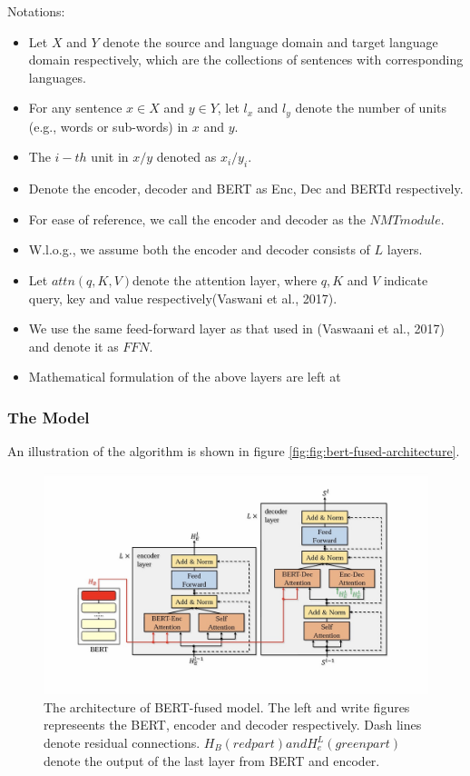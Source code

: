 \documentclass{report}
\begin{document}
Notations: 
\begin{itemize}
	\item Let $X$ and $Y$ denote the source and language domain and target language domain respectively, which are the collections of sentences with corresponding languages.
	\item For any sentence $x \in X$ and $y \in Y$, let $l_x$ and $l_y$ denote the number of units (e.g., words or sub-words) in $x$ and $y$. 
	\item The $i-th$ unit in $x/y$ denoted as $x_i /y_i$.
	\item Denote the encoder, decoder and BERT as Enc, Dec and BERTd respectively.
	\item For ease of reference, we call the encoder and decoder as the $NMT module$.
	\item W.l.o.g., we assume both the encoder and decoder consists of $L$ layers.
	\item Let $attn(q, K, V)$denote the attention layer, where $q, K$ and $V$ indicate query, key and value respectively(Vaswani et al., 2017).
	\item We use the same feed-forward layer as that used in (Vaswaani et al., 2017) and denote it as $FFN$.
	\item Mathematical formulation of the above layers are left at %
\end{itemize}

\subsubsection{The Model}
\label{sssec:bert-fused-the-model}
An illustration of the algorithm is shown in figure \ref{fig:fig:bert-fused-architecture}.
\begin{figure}[h] %
	\includegraphics{images/bert-fused-model/architecture.jpeg}
	\caption{The architecture of BERT-fused model. The left and write figures represeents the BERT, encoder and decoder respectively. Dash lines denote residual connections. $H_B(red part) and H_e^L (green part)$ denote the output of the last layer from BERT and encoder.}
	\label{fig:bert-fused-architecture}
\end{figure}
\end{document}
